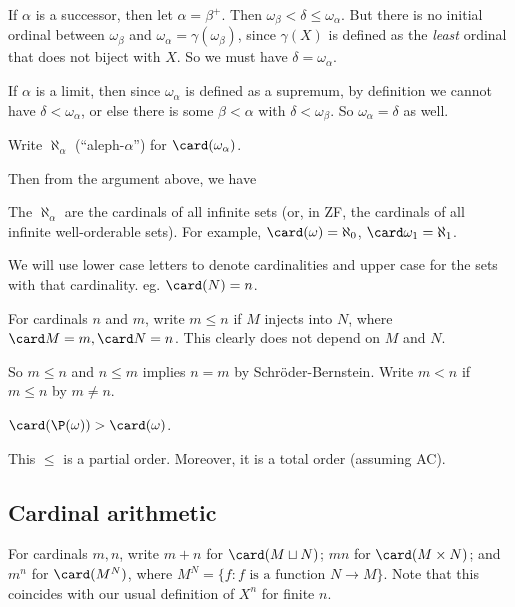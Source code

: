 \documentclass[a4paper]{article}
\begin{document}
If $\alpha$ is a successor, then let $\alpha = \beta^+$. Then $\omega_\beta < \delta \leq \omega_\alpha$. But there is no initial ordinal between $\omega_\beta$ and $\omega_\alpha = \gamma(\omega_\beta)$, since $\gamma(X)$ is defined as the \emph{least} ordinal that does not biject with $X$. So we must have $\delta = \omega_\alpha$.

If $\alpha$ is a limit, then since $\omega_\alpha$ is defined as a supremum, by definition we cannot have $\delta < \omega_\alpha$, or else there is some $\beta < \alpha$ with $\delta < \omega_\beta$. So $\omega_\alpha = \delta$ as well.

\begin{defi}\index{$\aleph_\alpha$}
  Write $\aleph_\alpha$ (``aleph-$\alpha$'') for $\card(\omega_\alpha)$.
\end{defi}

Then from the argument above, we have
\begin{thm}
  The $\aleph_\alpha$ are the cardinals of all infinite sets (or, in ZF, the cardinals of all infinite well-orderable sets). For example, $\card(\omega) = \aleph_0$, $\card \omega_1 = \aleph_1$.
\end{thm}

We will use lower case letters to denote cardinalities and upper case for the sets with that cardinality. eg. $\card(N) = n$.

\begin{defi}
  For cardinals $n$ and $m$, write $m \leq n$ if $M$ injects into $N$, where $\card M = m, \card N = n$. This clearly does not depend on $M$ and $N$.

  So $m \leq n$ and $n\leq m$ implies $n = m$ by Schr\"oder-Bernstein. Write $m < n$ if $m \leq n$ by $m\not = n$.
\end{defi}

\begin{eg}
  $\card(\P(\omega)) > \card(\omega)$.
\end{eg}

This $\leq$ is a partial order. Moreover, it is a total order (assuming AC).

\subsection{Cardinal arithmetic}
\begin{defi}
  For cardinals $m, n$, write $m + n$ for $\card(M\sqcup N)$; $mn$ for $\card(M\times N)$; and $m^n$ for $\card(M^N)$, where $M^N = \{f: f\text{ is a function }N\to M\}$. Note that this coincides with our usual definition of $X^n$ for finite $n$.
\end{defi}
\end{document}
